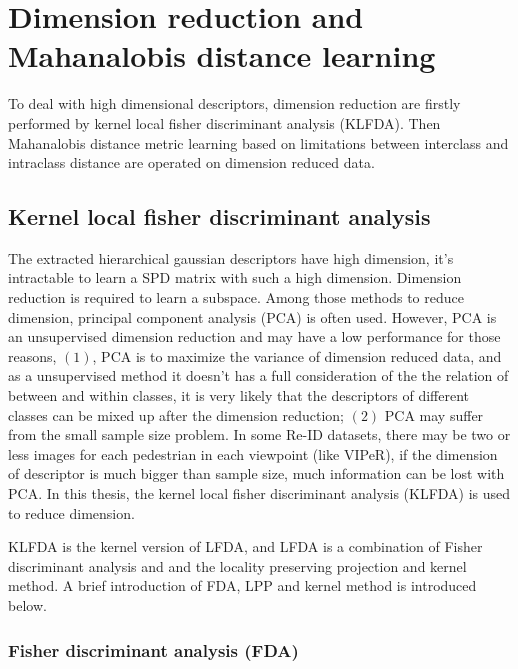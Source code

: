 \chapter{Dimension reduction and Mahanalobis distance learning}
To deal with high dimensional descriptors, dimension reduction are firstly performed by kernel local fisher discriminant analysis (KLFDA). Then Mahanalobis distance metric learning based on limitations between interclass and intraclass distance are operated on dimension reduced data.
\section{Kernel local fisher discriminant analysis}
The extracted hierarchical gaussian descriptors have high dimension, it's intractable to learn a SPD matrix with such a high dimension. Dimension reduction is required to learn a subspace.
Among those methods to reduce dimension, principal component analysis (PCA) is often used. However, PCA is an unsupervised dimension reduction and may have a low performance for those reasons, $(1)$, PCA is to maximize the variance of dimension reduced data, and as a unsupervised method it doesn't has a full consideration of the the relation of between and within classes, it is very likely that the descriptors of different classes can be mixed up after the dimension reduction; $(2)$ PCA may suffer from the small sample size problem. In some Re-ID datasets, there may be two or less images for each pedestrian in each viewpoint (like VIPeR), if the dimension of descriptor is much bigger than sample size, much information can be lost with PCA. In this thesis, the kernel local fisher discriminant analysis (KLFDA) is used to reduce dimension. 

KLFDA is the kernel version of LFDA, and LFDA is a combination of Fisher discriminant analysis \cite{LFDA} and and the locality preserving projection \cite{LPP} and kernel method. A brief introduction of FDA, LPP and kernel method is introduced below.
\subsection{Fisher discriminant analysis (FDA)}

